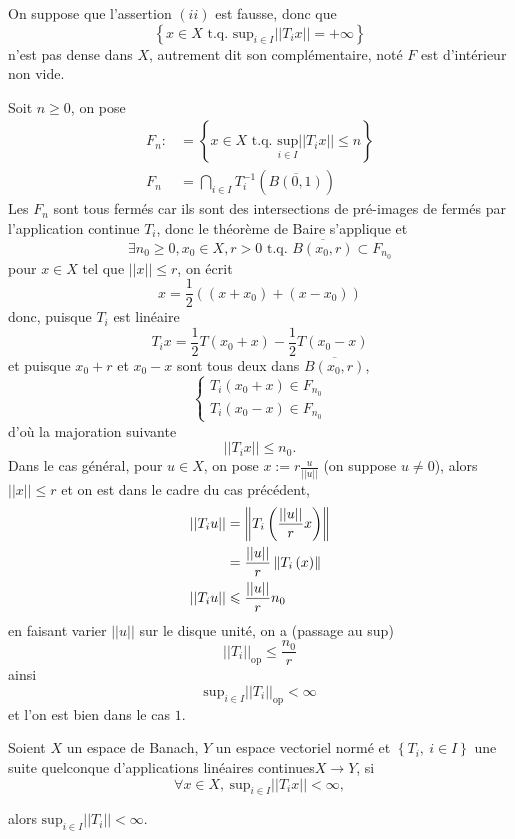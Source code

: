 \documentclass[a4paper,11pt, twoside]{article}
\begin{document}
\begin{Proof}
  On suppose que l'assertion $(ii)$ est fausse, donc que 
  $$\left\{x\in X\text{ t.q. } \mathrm{sup}_{i\in I}||T_ix||=+\infty\right\}$$ 
  n'est pas dense dans $X$, autrement dit son complémentaire, noté $F$ est d'intérieur non vide.

  Soit $n\geqslant 0$, on pose 
  \begin{align*}
    F_n:&=\left\{x\in X\text{ t.q. }\underset{i\in I}{\mathrm{sup}}||T_ix||\leqslant n\right\}\\
    F_n&=\bigcap_{i\in I}T_i^{-1}\left(\overline{B(0,1)}\right)
  \end{align*}
  Les $F_n$ sont tous fermés car ils sont des intersections de pré-images de fermés par l'application continue $T_i$, donc le théorème de Baire s'applique et 
  $$\exists n_0\geqslant 0, x_0\in X, r>0\text{ t.q. }\overline{B(x_0,r)}\subset F_{n_0}$$
  pour $x\in X$ tel que $||x||\leqslant r$, on écrit
  $$x=\frac12\left((x+x_0)+(x-x_0)\right)$$
  donc, puisque $T_i$ est linéaire
  $$T_ix=\frac12T(x_0+x)-\frac12T(x_0-x)$$
  et puisque $x_0+r$ et $x_0-x$ sont tous deux dans $\overline{B(x_0,r)}$, 
  $$\left\{\begin{array}{l}
    T_i(x_0+x)\in F_{n_0}\\
    T_i(x_0-x)\in F_{n_0}
  \end{array}\right.$$
  d'où la majoration suivante 
  $$||T_ix||\leqslant n_0.$$
  Dans le cas général, pour $u\in X$, on pose $x:=r\frac{u}{||u||}$ (on suppose $u\neq 0$), alors $||x||\leqslant r$ et on est dans le cadre du cas précédent, 
  \begin{align*}
    ||T_iu||&=\left\lVert T_i\left(\frac{||u||}{r}x\right)\right\rVert\\
    &=\frac{||u||}{r}\left\lVert T_i\left(x\right)\right\rVert\\
    ||T_iu||&\leqslant \frac{||u||}{r} n_0
  \end{align*}
  en faisant varier $||u||$ sur le disque unité, on a (passage au sup)
  $$||T_i||_{\mathrm{op}}\leqslant \frac{n_0}{r}$$
  ainsi 
  $$\mathrm{sup}_{i\in I}||T_i||_{\mathrm{op}}<\infty$$
  et l'on est bien dans le cas $\mathit 1$.
\end{Proof}


\begin{corollaire}
  Soient $X$ un espace de Banach, $Y$ un espace vectoriel normé et $\left\{T_i,\ i\in I\right\}$ une suite quelconque d'applications linéaires continues$X\longrightarrow Y$, si 
  $$\forall x\in X,\ \mathrm{sup}_{i\in I}||T_ix||<\infty,$$

  alors $\mathrm{sup}_{i\in I}||T_i||<\infty.$
\end{corollaire}
\end{document}
